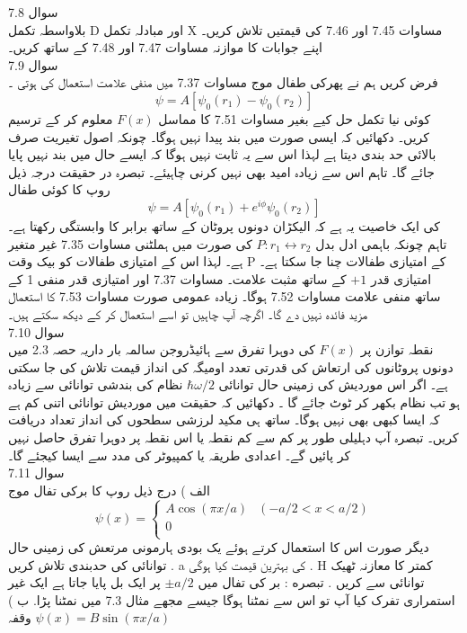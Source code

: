 سوال 
7.8\\
بلاواسطہ تکمل D اور مبادلہ تکمل X مساوات 7.45 اور 7.46 کی قیمتیں تلاش کریں۔ اپنے جوابات کا موازنہ مساوات 7.47 اور 7.48 کے ساتھ کریں۔ \\
سوال 
7.9\\
فرض کریں ہم نے پھرکی طفال موج مساوات 7.37 میں منفی علامت استعمال کی ہوتی ۔
\[\psi=A[\psi_{0}(r_{1})-\psi_{0}(r_{2})]\]
کوئی نیا تکمل حل کیے بغیر مساوات 7.51 کا مماسل
\( F(x)\) 
معلوم کر کے ترسیم کریں۔ دکھائیں کہ ایسی صورت میں بند پیدا نہیں ہوگا۔ چونکہ اصول تغیریت صرف بالائی حد بندی دیتا ہے لہذا اس سے یہ ثابت نہیں ہوگا کہ ایسے حال میں بند نہیں پایا جائے گا۔ تاہم اس سے زیادہ امید بھی نہیں کرنی چاہیئے۔ تبصرہ در حقیقت درجہ ذیل روپ کا کوئی طفال 
\[\psi=A[\psi_{0}(r_{1})+e^{i\phi}\psi_{0}(r_{2})]\]
کی ایک خاصیت یہ ہے کہ الیکڑان دونوں پروٹان کے ساتھ برابر کا وابستگی رکھتا ہے۔ تاہم چونکہ باہمی ادل بدل 
\(P: r_{1}\leftrightarrow r_{2}\)
کی صورت میں ہملٹنی مساوات 7.35 غیر متغیر ہے۔ لہذا اس کے امتیازی طفالات کو بیک وقت P کے امتیازی طفالات چنا جا سکتا ہے۔ امتیازی قدر
\(+1\)
کے ساتھ مثبت علامت۔ مساوات 7.37 اور امتیازی قدر منفی 1 کے ساتھ منفی علامت مساوات 7.52 ہوگا۔ زیادہ عمومی صورت مساوات 7.53 کا استعمال مزید فائدہ نہیں دے گا۔ اگرچہ آپ چاہیں تو اسے استعمال کر کے دیکھ سکتے ہیں۔\\
سوال 
7.10\\
نقطہ توازن پر
\( F(x)\)
 کی دوہرا تفرق سے ہائیڈروجن سالمہ بار داریہ حصہ 2.3 میں دونوں پروٹانوں کی ارتعاش کی قدرتی تعدد اومیگہ کی انداز قیمت تلاش کی جا سکتی ہے۔ اگر اس موردیش کی زمینی حال توانائی 
 \(\hbar\omega/2\)
 نظام کی بندشی توانائی سے زیادہ ہو تب نظام بکھر کر ٹوٹ جائے گا ۔ دکھائیں کہ حقیقت میں موردیش توانائی اتنی کم ہے کہ ایسا کبھی بھی نہیں ہوگا۔ ساتھ ہی مکید لرزشی سطحوں کی انداز تعداد دریافت کریں۔ تبصرہ 
آپ دہلیلی طور پر کم سے کم نقطہ یا اس نقطہ پر دوہرا تفرق حاصل نہیں کر پائیں گے۔ اعدادی طریقہ یا کمپیوٹر کی مدد سے ایسا کیجئے گا۔\\
سوال 
7.11\\
الف ) درج ذیل روپ کا برکی تفال موج
\[\psi(x)=\begin{cases}
A\cos{(\pi x/a)} & (-a/2<x<a/2)\\
0\\
\end{cases}\]
دیگر صورت
اس کا استعمال کرتے ہوئے یک بودی ہارمونی مرتعش کی زمینی حال توانائی کی حدبندی تلاش کریں . a کی بہترین قیمت کیا ہوگی . H کمتر کا معازنہ ٹھیک توانائی سے کریں .
تبصره : بر کی تفال میں
\(\pm a/2\)
پر ایک بل پایا جاتا ہے ایک غیر استمراری تفرک کیا آپ تو اس سے نمٹنا ہوگا جیسے مجھے مثال 7.3 میں نمٹنا پڑا.
ب ) وقفہ
\(\psi(x)=B\sin{(\pi x/a)}\)
